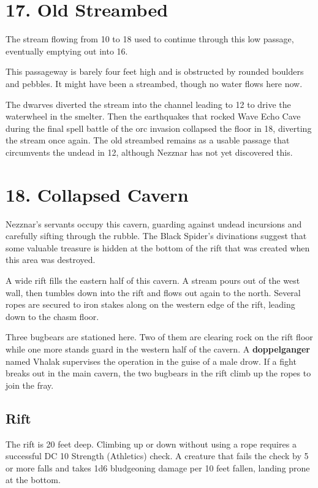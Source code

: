 \documentclass[10pt,a4paper,twoside,bg=print,twocolumn,openany,nodeprecatedcode]{dndbook}
\begin{document}
\section{17. Old Streambed}
The stream flowing from 10 to 18 used to continue through this low passage, eventually emptying out into 16.

\begin{DndReadAloud}{}
This passageway is barely four feet high and is obstructed by rounded boulders and pebbles. It might have been a streambed, though no water flows here now.

\end{DndReadAloud}

The dwarves diverted the stream into the channel leading to 12 to drive the waterwheel in the smelter. Then the earthquakes that rocked Wave Echo Cave during the final spell battle of the orc invasion collapsed the floor in 18, diverting the stream once again. The old streambed remains as a usable passage that circumvents the undead in 12, although Nezznar has not yet discovered this.

\section{18. Collapsed Cavern}
Nezznar's servants occupy this cavern, guarding against undead incursions and carefully sifting through the rubble. The Black Spider's divinations suggest that some valuable treasure is hidden at the bottom of the rift that was created when this area was destroyed.

\begin{DndReadAloud}{}
A wide rift fills the eastern half of this cavern. A stream pours out of the west wall, then tumbles down into the rift and flows out again to the north. Several ropes are secured to iron stakes along on the western edge of the rift, leading down to the chasm floor.

\end{DndReadAloud}

Three bugbears are stationed here. Two of them are clearing rock on the rift floor while one more stands guard in the western half of the cavern. A \textbf{doppelganger} named Vhalak supervises the operation in the guise of a male drow. If a fight breaks out in the main cavern, the two bugbears in the rift climb up the ropes to join the fray.

\subsection{Rift}
The rift is 20 feet deep. Climbing up or down without using a rope requires a successful DC 10 Strength (Athletics) check. A creature that fails the check by 5 or more falls and takes 1d6 bludgeoning damage per 10 feet fallen, landing prone at the bottom.
\end{document}
